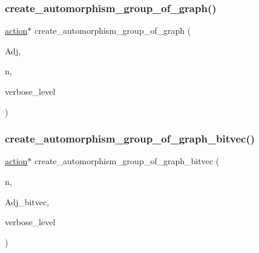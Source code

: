 \mbox{\label{action__global_8_c_a7b41a54fbadf9f29d8bcb291d849ceae}} 
\subsubsection{\texorpdfstring{create\+\_\+automorphism\+\_\+group\+\_\+of\+\_\+graph()}{create\_automorphism\_group\_of\_graph()}}
{\footnotesize\ttfamily \mbox{\hyperlink{classaction}{action}}$\ast$ create\+\_\+automorphism\+\_\+group\+\_\+of\+\_\+graph (\begin{DoxyParamCaption}\item[{\mbox{\hyperlink{galois_8h_a09fddde158a3a20bd2dcadb609de11dc}{I\+NT}} $\ast$}]{Adj,  }\item[{\mbox{\hyperlink{galois_8h_a09fddde158a3a20bd2dcadb609de11dc}{I\+NT}}}]{n,  }\item[{\mbox{\hyperlink{galois_8h_a09fddde158a3a20bd2dcadb609de11dc}{I\+NT}}}]{verbose\+\_\+level }\end{DoxyParamCaption})}

\mbox{\label{action__global_8_c_a764fd1eb54df127b155b0d3f9bc80068}} 
\subsubsection{\texorpdfstring{create\+\_\+automorphism\+\_\+group\+\_\+of\+\_\+graph\+\_\+bitvec()}{create\_automorphism\_group\_of\_graph\_bitvec()}}
{\footnotesize\ttfamily \mbox{\hyperlink{classaction}{action}}$\ast$ create\+\_\+automorphism\+\_\+group\+\_\+of\+\_\+graph\+\_\+bitvec (\begin{DoxyParamCaption}\item[{\mbox{\hyperlink{galois_8h_a09fddde158a3a20bd2dcadb609de11dc}{I\+NT}}}]{n,  }\item[{\mbox{\hyperlink{galois_8h_a122c4acf389c050379f00341fdcd5812}{U\+B\+Y\+TE}} $\ast$}]{Adj\+\_\+bitvec,  }\item[{\mbox{\hyperlink{galois_8h_a09fddde158a3a20bd2dcadb609de11dc}{I\+NT}}}]{verbose\+\_\+level }\end{DoxyParamCaption})}

